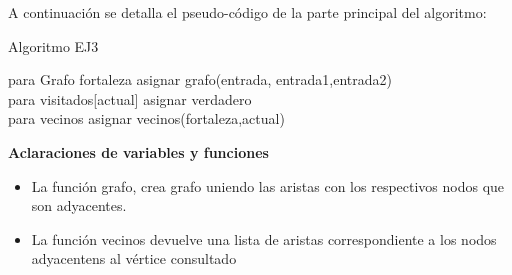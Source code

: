 A continuaci\'on se detalla el pseudo-c\'odigo de la parte principal del algoritmo:

\begin{algorithm}[H] %
 \caption{Algoritmo EJ3}
 	para Grafo fortaleza asignar grafo(entrada, entrada1,entrada2)\\
 	{
	para visitados[actual] asignar verdadero\\
	para vecinos asignar vecinos(fortaleza,actual)\\
 	}
\end{algorithm}


\textbf{Aclaraciones de variables y funciones}
\begin{itemize}
\item La funci\'on grafo, crea grafo uniendo las aristas con los respectivos nodos que son adyacentes.
\item La funci\'on vecinos devuelve una lista de aristas correspondiente a los nodos adyacentens al v\'ertice consultado
\end{itemize}
